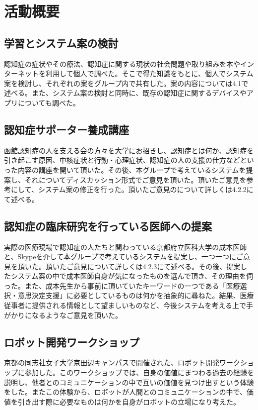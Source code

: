 \documentclass[../report]{subfiles}
\begin{document}
\section{活動概要}
\subsection{学習とシステム案の検討}\label{sec:kentou}
認知症の症状やその療法、認知症に関する現状の社会問題や取り組みを本やインターネットを利用して個人で調べた。そこで得た知識をもとに、個人でシステム案を検討し、それぞれの案をグループ内で共有した。案の内容については4.1で述べる。また、システム案の検討と同時に、既存の認知症に関するデバイスやアプリについても調べた。

\subsection{認知症サポーター養成講座}
函館認知症の人を支える会の方々を大学にお招きし、認知症とは何か、認知症を引き起こす原因、中核症状と行動・心理症状、認知症の人の支援の仕方などといった内容の講座を開いて頂いた。その後、本グループで考えているシステムを提案し、それについてディスカッション形式でご意見を頂いた。頂いたご意見を参考にして、システム案の修正を行った。頂いたご意見のについて詳しくは4.2.2にて述べる。

\subsection{認知症の臨床研究を行っている医師への提案}
実際の医療現場で認知症の人たちと関わっている京都府立医科大学の成本医師と、Skypeを介して本グループで考えているシステムを提案し、一つ一つにご意見を頂いた。頂いたご意見について詳しくは4.2.3にて述べる。その後、提案したシステム案の中で成本医師自身が気になったものを選んで頂き、その理由を伺った。また、成本先生から事前に頂いていたキーワードの一つである「医療選択・意思決定支援」に必要としているものは何かを抽象的に尋ねた。結果、医療従事者に提供される情報として望ましいものなど、今後システムを考える上で手がかりになるようなご意見を頂いた。

\subsection{ロボット開発ワークショップ}
京都の同志社女子大学京田辺キャンパスで開催された、ロボット開発ワークショップに参加した。このワークショップでは、自身の価値にまつわる過去の経験を説明し、他者とのコミュニケーションの中で互いの価値を見つけ出すという体験をした。またこの体験から、ロボットが人間とのコミュニケーションの中で、価値を引き出す際に必要なものは何かを自身がロボットの立場になり考えた。
\end{document}
